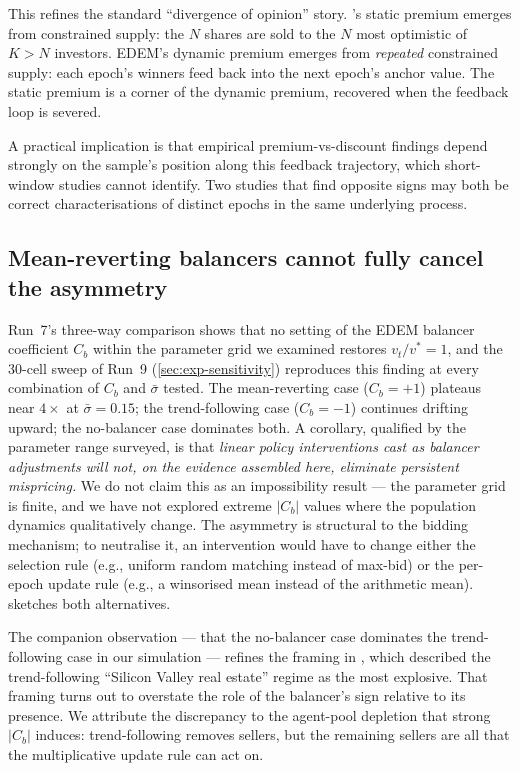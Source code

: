 This refines the standard ``divergence of opinion'' story.
\citet{miller1977}'s static premium emerges from constrained supply:
the $N$ shares are sold to the $N$ most optimistic of $K > N$
investors. EDEM's dynamic premium emerges from \emph{repeated}
constrained supply: each epoch's winners feed back into the next
epoch's anchor value. The static premium is a corner of the dynamic
premium, recovered when the feedback loop is severed.

A practical implication is that empirical premium-vs-discount
findings depend strongly on the sample's position along this
feedback trajectory, which short-window studies cannot identify.
Two studies that find opposite signs may both be correct
characterisations of distinct epochs in the same underlying process.

\subsection{Mean-reverting balancers cannot fully cancel the asymmetry}
\label{sec:disc-balancer}

Run~7's three-way comparison shows that no setting of the EDEM
balancer coefficient $C_{b}$ within the parameter grid we examined
restores $v_{t}/v^{*} = 1$, and the 30-cell sweep of Run~9
(\cref{sec:exp-sensitivity}) reproduces this finding at every
combination of $C_{b}$ and $\bar{\sigma}$ tested. The
mean-reverting case ($C_{b} = +1$) plateaus near $4 \times$ at
$\bar{\sigma} = 0.15$; the trend-following case ($C_{b} = -1$)
continues drifting upward; the no-balancer case dominates both. A
corollary, qualified by the parameter range surveyed, is that
\emph{linear policy interventions cast as balancer adjustments will
not, on the evidence assembled here, eliminate persistent
mispricing.} We do not claim this as an impossibility result --- the
parameter grid is finite, and we have not explored extreme
$|C_{b}|$ values where the population dynamics qualitatively change.
The asymmetry is structural to the bidding mechanism; to neutralise
it, an intervention would have to change either the selection rule
(e.g., uniform random matching instead of max-bid) or the per-epoch
update rule (e.g., a winsorised mean instead of the arithmetic
mean).  sketches both alternatives.

The companion observation --- that the no-balancer case dominates
the trend-following case in our simulation --- refines the framing
in \citet{arbuzov2018edem}, which described the trend-following
``Silicon Valley real estate'' regime as the most explosive. That
framing turns out to overstate the role of the balancer's sign
relative to its presence. We attribute the discrepancy to the
agent-pool depletion that strong $|C_{b}|$ induces: trend-following
removes sellers, but the remaining sellers are all that the
multiplicative update rule can act on.

